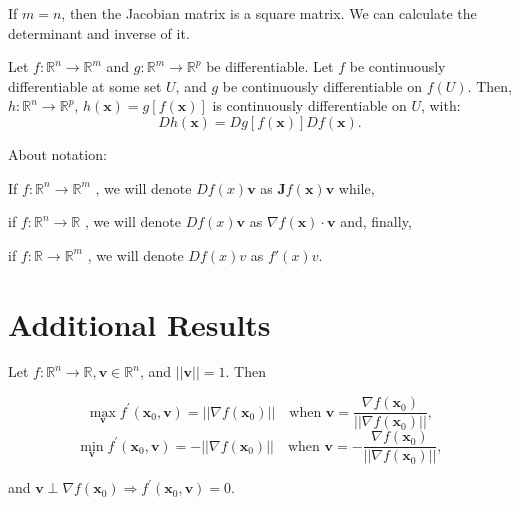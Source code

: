 \begin{remark*}
    If $m=n$, then the Jacobian matrix is a square matrix. We can calculate the determinant and inverse of it.
\end{remark*}

\begin{proposition}
    Let \(f: \mathbb{R}^{n} \rightarrow \mathbb{R}^{m}\) and \(g: \mathbb{R}^{m} \rightarrow \mathbb{R}^{p}\) be differentiable. Let \(f\) be continuously differentiable at some set \(U\), and \(g\) be continuously differentiable on \(f(U)\). Then, \(h: \mathbb{R}^{n} \rightarrow \mathbb{R}^{p}\), \(h(\mathbf{x}) = g[f(\mathbf{x})]\) is continuously differentiable on \(U\), with:
    \[
        D h(\mathbf{x}) = D g[f(\mathbf{x})]D f(\mathbf{x}).
    \]
\end{proposition}

\begin{remark*}
    About notation:

    If \(f: \mathbb{R}^{n} \rightarrow \mathbb{R}^{m}\) , we will denote
    \(D f(x)\mathbf{v}\) as \(\mathbf{J}f(\mathbf{x})\mathbf{v}\) while,

    if \(f: \mathbb{R}^{n} \rightarrow \mathbb{R}\) , we will denote
    \(D f(x)\mathbf{v}\) as \(\nabla f(\mathbf{x}) \cdot \mathbf{v}\) and,
    finally,

    if \(f: \mathbb{R} \rightarrow \mathbb{R}^{m}\) , we will denote
    \(D f(x)v\) as \(f'(x)v\).
\end{remark*}


\section{Additional Results}

\begin{proposition} Let \(f: \mathbb{R}^{n} \rightarrow \mathbb{R}, \mathbf{v} \in \mathbb{R}^{n}\), and \(||\mathbf{v}|| = 1\). Then

    \[
        \max_{\mathbf{v}}f^{\prime}(\mathbf{x}_{0},\mathbf{v}) = ||\nabla f(\mathbf{x}_{0})|| \quad \text{when } \mathbf{v} = \frac{\nabla f(\mathbf{x}_{0})}{||\nabla f(\mathbf{x}_{0})||},
    \]
    \[
        \min_{\mathbf{v}}f^{\prime}(\mathbf{x}_{0},\mathbf{v}) = -||\nabla f(\mathbf{x}_{0})|| \quad \text{when } \mathbf{v} = -\frac{\nabla f(\mathbf{x}_{0})}{||\nabla f(\mathbf{x}_{0})||},
    \]

    and \(\mathbf{v} \perp \nabla f(\mathbf{x}_{0}) \Rightarrow f^{\prime}(\mathbf{x}_{0}, \mathbf{v}) = 0\).
\end{proposition}

